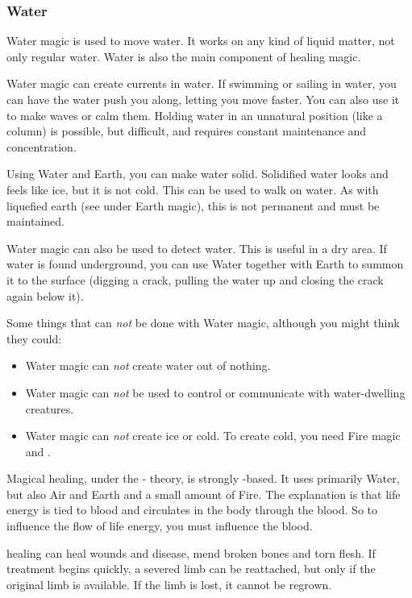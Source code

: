 \subsubsection{Water}
Water magic is used to move water. It works on any kind of liquid matter, not only regular water. Water is also the main component of healing magic. 

Water magic can create currents in water. If swimming or sailing in water, you can have the water push you along, letting you move faster. You can also use it to make waves or calm them. Holding water in an unnatural position (like a column) is possible, but difficult, and requires constant maintenance and concentration. 

Using Water and Earth, you can make water solid. Solidified water looks and feels like ice, but it is not cold. This can be used to walk on water. As with liquefied earth (see under Earth magic), this is not permanent and must be maintained. 

Water magic can also be used to detect water. This is useful in a dry area. If water is found underground, you can use Water together with Earth to summon it to the surface (digging a crack, pulling the water up and closing the crack again below it). 

Some things that can \emph{not} be done with Water magic, although you might think they could: 

\begin{itemize}
  \item Water magic can \emph{not} create water out of nothing. 

  \item Water magic can \emph{not} be used to control or communicate with water-dwelling creatures. 

  \item Water magic can \emph{not} create ice or cold. To create cold, you need Fire magic and \Itzach{}. 
\end{itemize}

Magical healing, under the \Iquin{}-\Itzach{} theory, is strongly \Iquin{}-based. It uses primarily Water, but also Air and Earth and a small amount of Fire. The explanation is that life energy is tied to blood and circulates in the body through the blood. So to influence the flow of life energy, you must influence the blood. 

\Iquin{} healing can heal wounds and disease, mend broken bones and torn flesh. If treatment begins quickly, a severed limb can be reattached, but only if the original limb is available. If the limb is lost, it cannot be regrown. 


